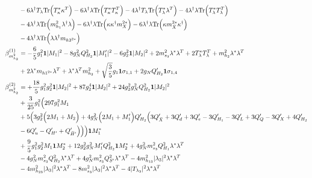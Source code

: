 {\begin{align}
 &-6 {\lambda^{\dagger}  T_{\lambda}} \mbox{Tr}\Big({T_{\kappa}^*  \kappa^{T}}\Big) -6 {\lambda^{\dagger}  \lambda} \mbox{Tr}\Big({T_{\kappa}^*  T_{\kappa}^{T}}\Big) -4 {\lambda^{\dagger}  T_{\lambda}} \mbox{Tr}\Big({T_{\lambda}^*  \lambda^{T}}\Big) -4 {\lambda^{\dagger}  \lambda} \mbox{Tr}\Big({T_{\lambda}^*  T_{\lambda}^{T}}\Big) \nonumber \\ 
 &-4 {\lambda^{\dagger}  \lambda} \mbox{Tr}\Big({m_{h_1}^2  \lambda^{\dagger}  \lambda}\Big) -6 {\lambda^{\dagger}  \lambda} \mbox{Tr}\Big({\kappa  \kappa^{\dagger}  m_{X}^{2 *}}\Big) -6 {\lambda^{\dagger}  \lambda} \mbox{Tr}\Big({\kappa  m_{\bar{X}}^{2 *}  \kappa^{\dagger}}\Big) \nonumber \\ 
 &-4 {\lambda^{\dagger}  \lambda} \mbox{Tr}\Big({\lambda  \lambda^{\dagger}  m_{{h 2}^{2 *}}}\Big) \\ 
\beta_{m_{h_2}^2}^{(1)} & =  
-\frac{6}{5} g_{1}^{2} {\bf 1} |M_1|^2 -8 g_{N}^{2} Q_{H_2}^{2} {\bf 1} |M_1'|^2 -6 g_{2}^{2} {\bf 1} |M_2|^2 +2 m_{s_3}^2 {\lambda^*  \lambda^{T}} +2 {T_{\lambda}^*  T_{\lambda}^{T}} +{m_{h_2}^2  \lambda^*  \lambda^{T}}\nonumber \\ 
 &+2 {\lambda^*  m_{{h 1}^{2 *}}  \lambda^{T}} +{\lambda^*  \lambda^{T}  m_{h_2}^2}+\sqrt{\frac{3}{5}} g_1 {\bf 1} \sigma_{1,1} +2 g_N Q_{H_2}' {\bf 1} \sigma_{1,4} \\ 
\beta_{m_{h_2}^2}^{(2)} & =  
+\frac{18}{5} g_{1}^{2} g_{2}^{2} {\bf 1} |M_2|^2 +87 g_{2}^{4} {\bf 1} |M_2|^2 +24 g_{2}^{2} g_{N}^{2} Q_{H_2}^{2} {\bf 1} |M_2|^2 \nonumber \\ 
 &+\frac{3}{25} g_{1}^{2} \Big(297 g_{1}^{2} M_1 \nonumber \\ 
 &+5 \Big(3 g_{2}^{2} \Big(2 M_1  + M_2\Big) + 4 g_{N}^{2} \Big(2 M_1  + M_1'\Big)Q_{H_2}' \Big(3 Q_{\bar{X}}'  + 3 Q_d'  + 3 Q_e'  -3 Q_{H_1}'  -3 Q_L'  + 3 Q_Q'  -3 Q_X'  + 4 Q_{H_2}' \nonumber\\
& -6 Q_u'  - Q_{H'}'  + Q_{\bar{H}'}'\Big)\Big)\Big){\bf 1} M_1^* \nonumber \\ 
 &+\frac{9}{5} g_{1}^{2} g_{2}^{2} M_1 {\bf 1} M_2^* +12 g_{2}^{2} g_{N}^{2} M_1' Q_{H_2}^{2} {\bf 1} M_2^* +4 g_{N}^{2} m_{s_3}^2 Q_{H_1}^{2} {\lambda^*  \lambda^{T}} \nonumber \\ 
 &-4 g_{N}^{2} m_{s_3}^2 Q_{H_2}^{2} {\lambda^*  \lambda^{T}} +4 g_{N}^{2} m_{s_3}^2 Q_{S'}^{2} {\lambda^*  \lambda^{T}} -4 m_{h_{13}}^2 |\lambda_3|^2 {\lambda^*  \lambda^{T}} \nonumber \\ 
 &-4 m_{h_{23}}^2 |\lambda_3|^2 {\lambda^*  \lambda^{T}} -8 m_{s_3}^2 |\lambda_3|^2 {\lambda^*  \lambda^{T}} -4 |T_{\lambda_3}|^2 {\lambda^*  \lambda^{T}} \nonumber \\ 

\end{align}}
